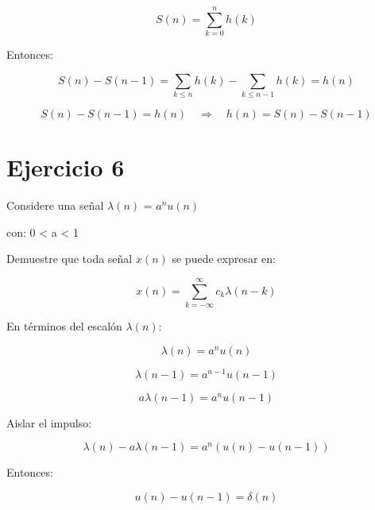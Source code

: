 \documentclass[12pt,a4paper]{article}
\begin{document}
\begin{equation}
S(n) = \sum_{k=0}^{n} h(k)
\end{equation}

Entonces:

\begin{equation}
S(n) - S(n-1) = \sum_{k\leq n} h(k) - \sum_{k\leq n-1} h(k) = h(n)
\end{equation}

\begin{equation}
S(n) - S(n-1) = h(n) \quad \Rightarrow  \boxed{\quad h(n) = S(n) - S(n-1)}
\end{equation}

\section*{Ejercicio 6}

Considere una señal  $\lambda(n)$ = $a^n u(n)$
\vspace{0.4cm}

con: 0 < a < 1 
\vspace{0.4cm}

Demuestre que toda señal $x(n)$ se puede expresar en: 

\begin{equation}
x(n) = \sum_{k=-\infty}^{\infty} c_k \lambda(n-k)
\end{equation}

En términos del escalón $\lambda(n)$:

\begin{equation}
\lambda(n) = a^n u(n)
\end{equation}

\begin{equation}
\lambda(n-1) = a^{n-1} u(n-1)
\end{equation}

\begin{equation}
a \lambda(n-1) = a^n u(n-1)
\end{equation}

Aislar el impulso:

\begin{equation}
\lambda(n) - a \lambda(n-1) = a^n(u(n) - u(n-1))
\end{equation}
\newpage

Entonces:

\begin{equation}
u(n) - u(n-1) = \delta(n)
\end{equation}
\end{document}
